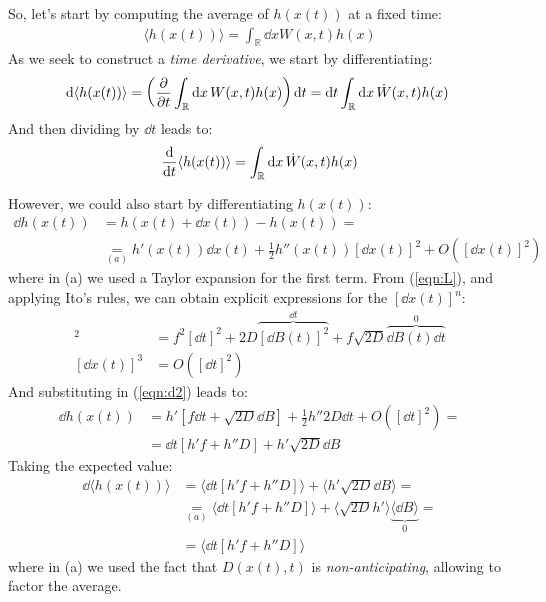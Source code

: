 \documentclass[../template.tex]{subfiles}
\begin{document}
So, let's start by computing the average of $h(x(t))$ at a fixed time:
\begin{align*}
    \langle h(x(t)) \rangle = \int_{\mathbb{R}} \dd{x} W(x,t) h(x)
\end{align*}
As we seek to construct a \textit{time derivative}, we start by differentiating:
\begin{align}
    \dd{\langle h(x(t)) \rangle} = \left(\pdv{t} \int_{\mathbb{R}} \dd{x} W(x,t) h(x)\right)\dd{t} = \dd{t} \int_{\mathbb{R}} \dd{x} \dot{W}(x,t) h(x)\
    \label{eqn:d1}
\end{align} 
And then dividing by $\dd{t}$ leads to:
\begin{align}
    \dv{t} \langle h(x(t)) \rangle = \int_{\mathbb{R}} \dd{x} \dot{W}(x,t) h(x)
    \label{eqn:d3}
\end{align}

However, we could also start by differentiating $h(x(t))$:
\begin{align}
    \dd{h(x(t))} &= h(x(t) + \dd{x}(t)) - h(x(t)) =    \\   
    &\underset{(a)}{=}  h'(x(t)) \dd{x}(t) + \frac{1}{2} h''(x(t))[\dd{x}(t)]^2 + O([\dd{x}(t)]^2)
    \label{eqn:d2}
\end{align}
where in (a) we used a Taylor expansion for the first term. From (\ref{eqn:L}), and applying Ito's rules, we can obtain explicit expressions for the $[\dd{x(t)}]^n$:
\begin{align*}
    [\dd{x(t)}]^2 &= f^2 [\dd{t}]^2 + 2D \overbrace{[\dd{B(t)}]^2}^{\dd{t}} + f \sqrt{2D} \overbrace{\dd{B(t)} \dd{t}}^{0}\\
    [\dd{x(t)}]^3 &= O([\dd{t}]^2)
\end{align*}
And substituting in (\ref{eqn:d2}) leads to:
\begin{align*}
    \dd{h(x(t))} &= h'[f\dd{t}+ \sqrt{2D} \dd{B}] + \frac{1}{2} h'' 2D \dd{t} + O([\dd{t}]^2) =\\
    &= \dd{t} [h'f + h'' D] + h'\sqrt{2D} \dd{B} 
\end{align*}
Taking the expected value:
\begin{align*}
    \dd{\langle h(x(t)) \rangle} &= \langle \dd{t} [h'f + h'' D] \rangle + \langle h' \sqrt{2D} \dd{B} \rangle =\\
    &\underset{(a)}{=}  \langle \dd{t}[h'f + h'' D] \rangle + \langle \sqrt{2D}h' \rangle \underbrace{\langle \dd{B} \rangle}_{0} =\\
    &= \langle \dd{t} [h'f + h'' D] \rangle 
\end{align*}
where in (a) we used the fact that $D(x(t),t)$ is \textit{non-anticipating}, allowing to factor the average. 
\end{document}
